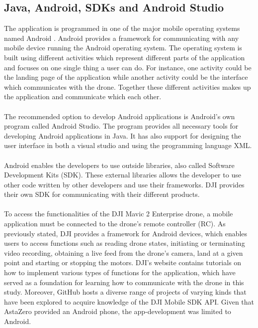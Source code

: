 \subsection{Java, Android, SDKs and Android Studio}
The application is programmed in one of the major mobile operating systems named Android . Android provides a framework for communicating with any mobile device running the Android operating system. The operating system is built using different activities which represent different parts of the application  and focuses on one single thing a user can do. For instance, one activity could be the landing page of the application while another activity could be the interface which communicates with the drone. Together these different activities makes up the application and communicate which each other.
\\ \\
The recommended option to develop Android applications is Android's own program called Android Studio. The program provides all necessary tools for developing Android applications in Java. It has also support for designing the user interface in both a visual studio and using the programming language XML.
\\ \\
Android enables the developers to use outside libraries, also called Software Development Kits (SDK). These external libraries allows the developer to use other code written by other developers and use their frameworks. DJI provides their own SDK for communicating with their different products.
\\ \\
To access the functionalities of the DJI Mavic 2 Enterprise drone, a mobile application must be connected to the drone's remote controller (RC). As previously stated, DJI provides a framework for Android devices, which enables users to access functions such as reading drone states, initiating or terminating video recording, obtaining a live feed from the drone's camera, land at a given point and starting or stopping the motors. DJI's website contains tutorials on how to implement various types of functions for the application, which have served as a foundation for learning how to communicate with the drone in this study. Moreover, GitHub hosts a diverse range of projects of varying kinds that have been explored to acquire knowledge of the DJI Mobile SDK API.
Given that AstaZero provided an Android phone, the app-development was limited to Android.



